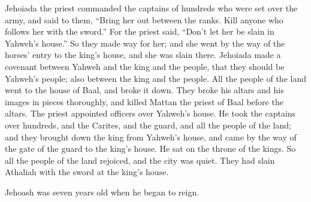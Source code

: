 {\par }{\PP {}Jehoiada the priest commanded the captains of hundreds who were set over the army, and said to them, “Bring her out between the ranks. Kill anyone who follows her with the sword.” For the priest said, “Don’t let her be slain in Yahweh’s house.”
So they made way for her; and she went by the way of the horses’ entry to the king’s house, and she was slain there.
Jehoiada made a covenant between Yahweh and the king and the people, that they should be Yahweh’s people; also between the king and the people.
All the people of the land went to the house of Baal, and broke it down. They broke his altars and his images in pieces thoroughly, and killed Mattan the priest of Baal before the altars. The priest appointed officers over Yahweh’s house.
He took the captains over hundreds, and the Carites, and the guard, and all the people of the land; and they brought down the king from Yahweh’s house, and came by the way of the gate of the guard to the king’s house. He sat on the throne of the kings.
So all the people of the land rejoiced, and the city was quiet. They had slain Athaliah with the sword at the king’s house.
\par }{\PP {}Jehoash was seven years old when he began to reign.

}
